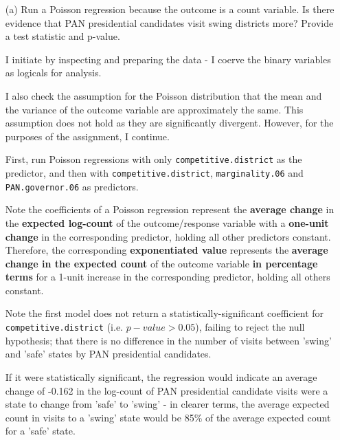 \documentclass[12pt,letterpaper]{article}
\begin{document}
\begin{enumerate}
	\item [(a)]
	Run a Poisson regression because the outcome is a count variable. Is there evidence that PAN presidential candidates visit swing districts more? Provide a test statistic and p-value.
	
	\noindent I initiate by inspecting and preparing the data - I coerve the binary variables as logicals for analysis.
	
	
	
	\noindent I also check the assumption for the Poisson distribution that the mean and the variance of the outcome variable are approximately the same. This assumption does not hold as they are significantly divergent. However, for the purposes of the assignment, I continue.
	
	
	
	\noindent First, run Poisson regressions with only \texttt{competitive.district} as the predictor, and then with \texttt{competitive.district}, \texttt{marginality.06} and \texttt{PAN.governor.06} as predictors.
	
	
	
	
	
	\noindent Note the coefficients of a Poisson regression represent the \textbf{average change} in the \textbf{expected log-count} of the outcome/response variable with a \textbf{one-unit change} in the corresponding predictor, holding all other predictors  constant. Therefore, the corresponding \textbf{exponentiated value} represents the \textbf{average change in the expected count} of the outcome variable \textbf{in percentage terms} for a 1-unit increase in the corresponding predictor, holding all others constant.
	
	\noindent Note the first model does not return a statistically-significant coefficient for \texttt{competitive.district} (i.e. $p-value > 0.05$), failing to reject the null hypothesis; that there is no difference in the number of visits between 'swing' and 'safe' states by PAN presidential candidates.
	
	If it were statistically significant, the regression would indicate an average change of -0.162 in the log-count of PAN presidential candidate visits were a state to change from 'safe' to 'swing' - in clearer terms, the average expected count in visits to a 'swing' state would be 85\% of the average expected count for a 'safe' state.
	

\end{enumerate}
\end{document}
